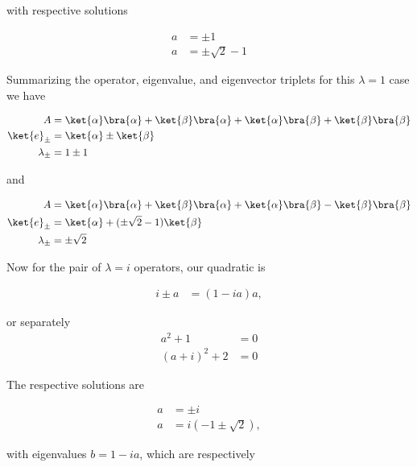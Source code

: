 with respective solutions

\begin{align}\label{eqn:desaiDiracNotes:66}
a &= \pm 1 \\
a &= \pm \sqrt{2} - 1
\end{align}

Summarizing the operator, eigenvalue, and eigenvector triplets for this $\lambda = 1$ case we have

\begin{subequations}
\label{eqn:desaiDiracNotes:67}
\begin{align}
A &=
\ket{\alpha}\bra{\alpha}
+ \ket{\beta}\bra{\alpha}
+ \ket{\alpha}\bra{\beta}
+ \ket{\beta}\bra{\beta} \\
\ket{e}_{\pm} &= \ket{\alpha} \pm \ket{\beta} \\
\lambda_{\pm} &= 1 \pm 1 
\end{align}
\end{subequations}

and

\begin{subequations}
\label{eqn:desaiDiracNotes:68}
\begin{align}
A &=
\ket{\alpha}\bra{\alpha}
+ \ket{\beta}\bra{\alpha}
+ \ket{\alpha}\bra{\beta}
- \ket{\beta}\bra{\beta} \\
\ket{e}_{\pm} &= \ket{\alpha} + (\pm \sqrt{2} - 1) \ket{\beta} \\
\lambda_{\pm} &= \pm \sqrt{2}
\end{align}
\end{subequations}

Now for the pair of $\lambda = i$ operators, our quadratic is

\begin{align}\label{eqn:desaiDiracNotes:64i}
i \pm a &= (1 - i a) a,
\end{align}

or separately
\begin{align}\label{eqn:desaiDiracNotes:64ii}
a^2 + 1 &= 0 \\
(a + i)^2 + 2 &= 0
\end{align}

The respective solutions are

\begin{align}\label{eqn:desaiDiracNotes:66i}
a &= \pm i \\
a &= i (-1 \pm \sqrt{2} ),
\end{align}

with eigenvalues $b = 1 - i a$, which are respectively

